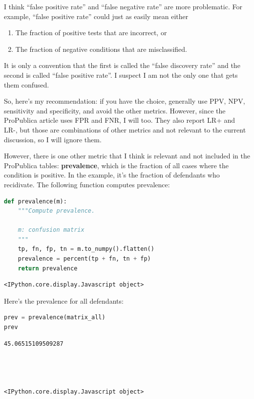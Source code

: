 I think ``false positive rate'' and ``false negative rate'' are more
problematic. For example, ``false positive rate'' could just as easily
mean either

\begin{enumerate}
\def\labelenumi{\arabic{enumi}.}
\item
  The fraction of positive tests that are incorrect, or
\item
  The fraction of negative conditions that are misclassified.
\end{enumerate}

It is only a convention that the first is called the ``false discovery
rate'' and the second is called ``false positive rate''. I suspect I am
not the only one that gets them confused.

So, here's my recommendation: if you have the choice, generally use PPV,
NPV, sensitivity and specificity, and avoid the other metrics. However,
since the ProPublica article uses FPR and FNR, I will too. They also
report LR+ and LR-, but those are combinations of other metrics and not
relevant to the current discussion, so I will ignore them.

However, there is one other metric that I think is relevant and not
included in the ProPublica tables: \textbf{prevalence}, which is the
fraction of all cases where the condition is positive. In the example,
it's the fraction of defendants who recidivate. The following function
computes prevalence:

\begin{lstlisting}[language=Python,style=source]
def prevalence(m):
    """Compute prevalence.

    m: confusion matrix
    """
    tp, fn, fp, tn = m.to_numpy().flatten()
    prevalence = percent(tp + fn, tn + fp)
    return prevalence
\end{lstlisting}

\begin{lstlisting}[style=output]
<IPython.core.display.Javascript object>
\end{lstlisting}

Here's the prevalence for all defendants:

\begin{lstlisting}[language=Python,style=source]
prev = prevalence(matrix_all)
prev
\end{lstlisting}

\begin{lstlisting}[style=output]
45.06515109509287




<IPython.core.display.Javascript object>
\end{lstlisting}

